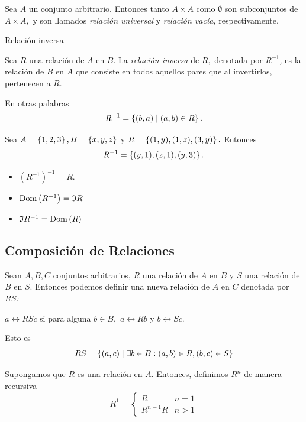 	Sea $A$ un conjunto arbitrario. Entonces tanto $A\times A$ como $\emptyset$ son subconjuntos de $A \times A,$ y son llamados \emph{relaci\'on universal} y \emph{relaci\'on vac\'ia,} respectivamente.



	{Relaci\'on inversa}
	
	Sea $R$ una relaci\'on de $A$ en $B.$ La \emph{relaci\'on inversa} de $R,$ denotada por \emph{$R^{-1}$,} es la relaci\'on de $B$ en $A$ que consiste en todos aquellos pares que al invertirlos, pertenecen a $R.$ 
	
	En otras palabras
	$$
	R^{-1}=\left\{ (b,a)\mid (a,b)\in R \right\}.
	$$



	\begin{exmp}
		Sea $A=\left\{ 1,2,3 \right\}, B=\left\{ x,y,z \right\}$ y $R=\left\{ (1,y),(1,z),(3,y) \right\}.$ Entonces
		$$
		R^{-1}=\left\{ (y,1), (z,1), (y,3) \right\}.
		$$
	\end{exmp}



	\begin{rem}
		\begin{itemize}
			\item $\left( R^{-1} \right)^{-1}=R.$
			\item $\operatorname{Dom}\left( R^{-1} \right)=\mathfrak{I}{R}$
			\item $\mathfrak{I}{R^{-1}}=\operatorname{Dom}\left( R \right)$
		\end{itemize}
	\end{rem}




\subsection{Composici\'on de Relaciones}

	Sean $A,B,C$ conjuntos arbitrarios, $R$ una relaci\'on de $A$ en $B$ y $S$ una relaci\'on de $B$ en $S.$  Entonces podemos definir una nueva relaci\'on de $A$ en $C$ denotada por \emph{$RS$:}
	\begin{center}
		$a\rel{{RS}}c$ si para alguna $b \in B,$ $a\rel{R}b$ y $b\rel{S}c.$
	\end{center} 



	Esto es
	$$
	RS=\left\{ (a,c)\mid \exists b\in B: (a,b)\in R, (b,c)\in S \right\}
	$$



	Supongamos que $R$ es una relaci\'on en $A.$ Entonces, definimos $R^{n}$ de manera recursiva
	$$
	R^{1}=
	\begin{cases}
		R & n=1 \\
		R^{n-1}R & n>1
	\end{cases}
	$$



